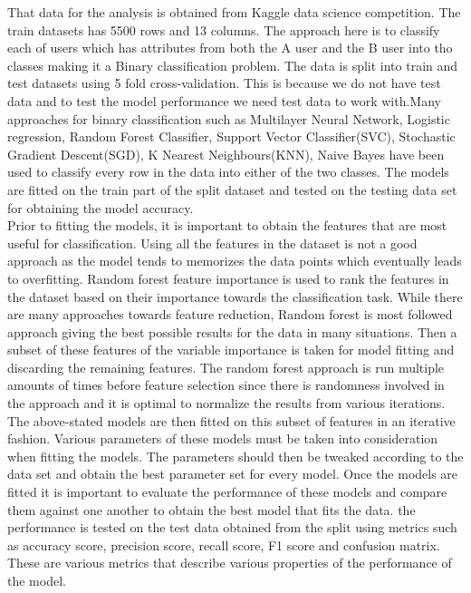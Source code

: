 \documentclass[sigconf]{acmart}
\begin{document}
That data for the analysis is obtained from Kaggle data science competition. The train datasets has 5500 rows and 13 columns. The approach here is to classify each of users which has attributes from both the A user and the B user into tho classes making it a Binary classification problem. The data is split into train and test datasets using 5 fold cross-validation. This is because we do not have test data and to test the model performance we need test data to work with.Many approaches for binary classification such as Multilayer Neural Network, Logistic regression, Random Forest Classifier, Support Vector Classifier(SVC), Stochastic Gradient Descent(SGD), K Nearest Neighbours(KNN), Naive Bayes have been used to classify every row in the data into either of the two classes. The models are fitted on the train part of the split dataset and tested on the testing data set for obtaining the model accuracy.\\
Prior to fitting the models, it is important to obtain the features that are most useful for classification. Using all the features in the dataset is not a good approach as the model tends to memorizes the data points which eventually leads to overfitting. Random forest feature importance is used to rank the features in the dataset based on their importance towards the classification task. While there are many approaches towards feature reduction, Random forest is most followed approach giving the best possible results for the data in many situations. Then a subset of these features of the variable importance is taken for model fitting and discarding the remaining features. The random forest approach is run multiple amounts of times before feature selection since there is randomness involved in the approach and it is optimal to normalize the results from various iterations.\\
The above-stated models are then fitted on this subset of features in an iterative fashion. Various parameters of these models must be taken into consideration when fitting the models. The parameters should then be tweaked according to the data set and obtain the best parameter set for every model. Once the models are fitted it is important to evaluate the performance of these models and compare them against one another to obtain the best model that fits the data. the performance is tested on the test data obtained from the split using metrics such as accuracy score, precision score, recall score, F1 score and confusion matrix. These are various metrics that describe various properties of the performance of the model. 
\end{document}
